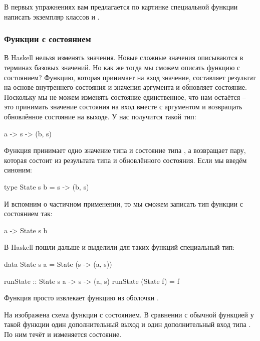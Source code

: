  В первых упражнениях вам предлагается по
 картинке специальной функции написать экземпляр
 классов  и . 


\subsubsection{Функции с состоянием}


В Haskell нельзя изменять значения. Новые сложные значения
описываются в терминах базовых значений. Но как же тогда
мы сможем описать функцию с состоянием? Функцию,
которая принимает на вход значение, составляет результат
на основе внутреннего состояния и значения аргумента и
обновляет состояние. Поскольку мы не можем изменять состояние
единственное, что нам остаётся -- это принимать значение
состояния на вход вместе с аргументом и возвращать
обновлённое состояние на выходе. У нас получится такой тип:

\begin{code}
a -> s -> (b, s)
\end{code}

Функция принимает одно значение типа  и 
состояние типа , а возвращает пару, которая
состоит из результата типа  и обновлённого 
состояния. Если мы введём синоним:

\begin{code}
type State s b = s -> (b, s)
\end{code}

И вспомним о частичном применении, то мы сможем
записать тип функции с состоянием так:

\begin{code}
a -> State s b 
\end{code}

В Haskell пошли дальше и выделили для таких
функций специальный тип:


\begin{code}
data State s a = State (s -> (a, s))

runState :: State s a -> s -> (a, s)
runState (State f) = f
\end{code}


Функция  просто извлекает функцию
из оболочки .

На  изображена схема функции с состоянием.
В сравнении с обычной функцией у такой функции один дополнительный 
выход и один дополнительный вход типа . По ним течёт и
изменяется состояние. 

